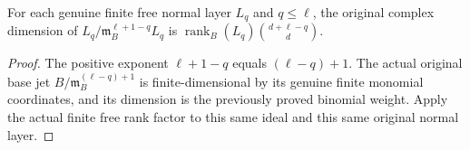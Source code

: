 \begin{theorem}
\label{hir:relative-normal-actual-weighted-layer-binomial-dimension}
\leanok
For each genuine finite free normal layer $L_q$ and $q\leq\ell$, the
original complex dimension of
$L_q/\mathfrak m_B^{\ell+1-q}L_q$ is
$\operatorname{rank}_B(L_q)\binom{d+\ell-q}{d}$.
\end{theorem}
\begin{proof}
The positive exponent $\ell+1-q$ equals $(\ell-q)+1$. The actual
original base jet $B/\mathfrak m_B^{(\ell-q)+1}$ is finite-dimensional
by its genuine finite monomial coordinates, and its dimension is the
previously proved binomial weight. Apply the actual finite free rank
factor to this same ideal and this same original normal layer.
\end{proof}

